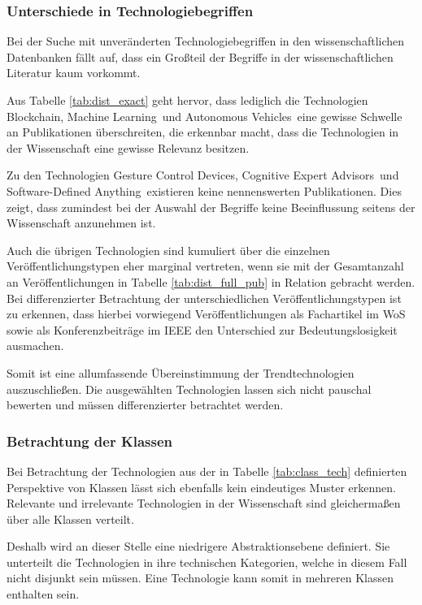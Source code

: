 \subsubsection{Unterschiede in Technologiebegriffen}
Bei der Suche mit unveränderten Technologiebegriffen in den wissenschaftlichen Datenbanken fällt auf, dass ein Großteil der Begriffe in der wissenschaftlichen Literatur kaum vorkommt.

Aus Tabelle \ref{tab:dist_exact} geht hervor, dass lediglich die Technologien \glqq Blockchain\grqq, \glqq Machine Learning\grqq~und \glqq Autonomous Vehicles\grqq~eine gewisse Schwelle an Publikationen überschreiten, die erkennbar macht, dass die Technologien in der Wissenschaft eine gewisse Relevanz besitzen.

Zu den Technologien \glqq Gesture Control Devices\grqq, \glqq Cognitive Expert Advisors\grqq~und \glqq Software-Defined Anything\grqq~existieren keine nennenswerten Publikationen. Dies zeigt, dass zumindest bei der Auswahl der Begriffe keine Beeinflussung seitens der Wissenschaft anzunehmen ist.

Auch die übrigen Technologien sind kumuliert über die einzelnen Ver\-öf\-fent\-lich\-ungs\-typen eher marginal vertreten, wenn sie mit der Gesamtanzahl an Veröffentlichungen in Tabelle \ref{tab:dist_full_pub} in Relation gebracht werden. Bei differenzierter Betrachtung der unterschiedlichen Veröffentlichungstypen ist zu erkennen, dass hierbei vorwiegend Veröffentlichungen als Fachartikel im \ac{WoS} sowie als Konferenzbeiträge im \ac{IEEE} den Unterschied zur Bedeutungslosigkeit ausmachen.

Somit ist eine allumfassende Übereinstimmung der Trendtechnologien auszuschließen. Die ausgewählten Technologien lassen sich nicht pauschal bewerten und müssen differenzierter betrachtet werden.

\subsubsection{Betrachtung der Klassen}
Bei Betrachtung der Technologien aus der in Tabelle \ref{tab:class_tech} definierten Perspektive von Klassen lässt sich ebenfalls kein eindeutiges Muster erkennen. Relevante und irrelevante Technologien in der Wissenschaft sind gleichermaßen über alle Klassen verteilt.

Deshalb wird an dieser Stelle eine niedrigere Abstraktionsebene definiert. Sie unterteilt die Technologien in ihre technischen Kategorien, welche in diesem Fall nicht disjunkt sein müssen. Eine Technologie kann somit in mehreren Klassen enthalten sein.

